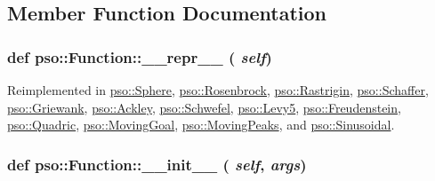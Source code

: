 \subsection{Member Function Documentation}
\hypertarget{classpso_1_1Function_959f07a6de4f333461fdb0261e6c25ae}{
\subsubsection{\setlength{\rightskip}{0pt plus 5cm}def pso::Function::\_\-\_\-repr\_\-\_\- ( {\em self})}}
\label{classpso_1_1Function_959f07a6de4f333461fdb0261e6c25ae}




Reimplemented in \hyperlink{classpso_1_1Sphere_97873feed050d378f3f3a83340619732}{pso::Sphere}, \hyperlink{classpso_1_1Rosenbrock_56aac438a1d2c22a725967ecef381344}{pso::Rosenbrock}, \hyperlink{classpso_1_1Rastrigin_e20e3e7a699b801c9fa78b531ae355c1}{pso::Rastrigin}, \hyperlink{classpso_1_1Schaffer_8b59b8cfafafad160fa0deac772d0191}{pso::Schaffer}, \hyperlink{classpso_1_1Griewank_511aaa7b5b0c146773011fc3d889e43f}{pso::Griewank}, \hyperlink{classpso_1_1Ackley_e8ad324464b4641ea1b71ba20d3fe12c}{pso::Ackley}, \hyperlink{classpso_1_1Schwefel_355d3604b3f13580871f2eeb90d42ef4}{pso::Schwefel}, \hyperlink{classpso_1_1Levy5_b10ee4210aa6d53ec66a9c79e6558e20}{pso::Levy5}, \hyperlink{classpso_1_1Freudenstein_593b2ae91d886ecccd01877ac2321ae4}{pso::Freudenstein}, \hyperlink{classpso_1_1Quadric_c345dddcc2571f2daaf90a6ba9dcc237}{pso::Quadric}, \hyperlink{classpso_1_1MovingGoal_9a7bc1af4d07be74f83fda41d598ef9b}{pso::MovingGoal}, \hyperlink{classpso_1_1MovingPeaks_a49761a17dfa13ee9bd3854cae9b6db7}{pso::MovingPeaks}, and \hyperlink{classpso_1_1Sinusoidal_b6343711af3f82150f169132f230fd80}{pso::Sinusoidal}.\hypertarget{classpso_1_1Function_6874097c6476dc85af64b40e76a807e9}{
\subsubsection{\setlength{\rightskip}{0pt plus 5cm}def pso::Function::\_\-\_\-init\_\-\_\- ( {\em self}, \/   {\em args})}}
\label{classpso_1_1Function_6874097c6476dc85af64b40e76a807e9}




